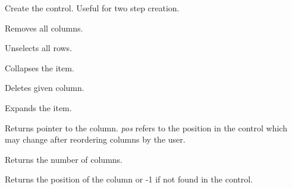 Create the control. Useful for two step creation.

\label{wxdataviewctrlclearcolumns}


Removes all columns.

\label{wxdataviewctrlclearselection}


Unselects all rows.

\label{wxdataviewctrlcollapse}   


Collapses the item.    
    
\label{wxdataviewctrldeletecolumn}


Deletes given column.

\label{wxdataviewctrlexpand}   


Expands the item.    
    
\label{wxdataviewctrlgetcolumn}


Returns pointer to the column. {\it pos} refers to the 
position in the control which may change after reordering
columns by the user.

\label{wxdataviewctrlgetcolumncount}


Returns the number of columns.

\label{wxdataviewctrlgetcolumnposition}


Returns the position of the column or -1 if not found in the control.

\label{wxdataviewctrlensurevisible}

